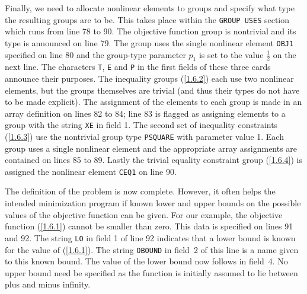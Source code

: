 \documentclass[a4paper]{article}
\newcommand{\req}[1]{(\ref{#1})}
\newcommand{\sfrac}[2]{{\scriptstyle \frac{#1}{#2}}}
\newcommand{\half}{\sfrac{1}{2}}
\begin{document}
Finally, we need to allocate nonlinear elements
to groups
and specify
what type the resulting groups are to  be. This takes place within the
{\tt GROUP USES}
section which runs from line 78 to 90.  The objective
function group is nontrivial and its type is announced on line 79. The
group uses  the single nonlinear element
{\tt OBJ1} specified on line
80    and the  group-type   parameter
$p_1$  is   set   to the  value
$\half$ on  the next line. The  characters {\tt T},  {\tt E} and
{\tt  P}
in the  first  fields  of these three  cards
announce their
purposes.  The inequality groups  \req{1.6.2} each use   two nonlinear
elements,
but the groups themselves are trivial
(and  thus their types
do not have to be made  explicit). The assignment of  the  elements to
each group is made in an  array
definition on lines 82  to 84; line 83
is flagged  as assigning elements to a  group with the string {\tt XE}
in field 1. The  second set of  inequality constraints
\req{1.6.3} use
the nontrivial group type {\tt PSQUARE} with parameter  value 1.
Each group  uses a  single  nonlinear  element
and  the   appropriate array
assignments  are contained   on lines 85    to 89. Lastly  the trivial
equality  constraint   group  \req{1.6.4}  is assigned the   nonlinear
element {\tt CEQ1} on line 90.

The definition of the problem is now complete. However, it often helps
the intended minimization program if known  lower and  upper bounds on
the possible values  of the objective function
can  be given.   For  our example,  the objective function \req{1.6.1}
cannot be smaller than zero. This  data is  specified on lines  91 and
92.  The string {\tt LO}
in field  1 of line 92 indicates  that a lower bound
is known for the
value of \req{1.6.1}.  The string {\tt OBOUND} in field~2 of this line
is a name given to this known bound. The value of  the lower bound now
follows in field~4.  No upper bound need be specified as  the function
is initially assumed to lie between plus and minus infinity.
\end{document}
